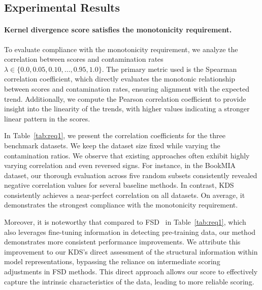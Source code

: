 
%
\subsection{Experimental Results}
\label{sec:er}


\paragraph{Kernel divergence score satisfies the monotonicity requirement.}
To evaluate compliance with the monotonicity requirement, we analyze the correlation between scores and contamination rates  $\lambda \in \{0.0, 0.05, 0.10, \ldots, 0.95, 1.0\}$.
The primary metric used is the Spearman correlation coefficient, which directly evaluates the monotonic relationship between scores and contamination rates, ensuring alignment with the expected trend.
Additionally, we compute the Pearson correlation coefficient to provide insight into the linearity of the trends, with higher values indicating a stronger linear pattern in the scores.

In Table~\ref{tab:req1}, we present the correlation coefficients for the three benchmark datasets. We keep the dataset size fixed while varying the contamination ratios.
We observe that existing approaches often exhibit highly varying correlation and even reversed signs.
For instance, in the BookMIA dataset, our thorough evaluation across five random subsets consistently revealed negative correlation values for several baseline methods. 
In contrast, KDS consistently achieves a near-perfect correlation on all datasets.
On average, it demonstrates the strongest compliance with the monotonicity requirement. 

Moreover, it is noteworthy that compared to FSD~\citep{zhang2024fine} in Table~\ref{tab:req1}, which also leverages fine-tuning information in detecting pre-training data, our method demonstrates more consistent performance improvements.
We attribute this improvement to our KDS's direct assessment of the structural information within model representations, bypassing the reliance on intermediate scoring adjustments in FSD methods. 
This direct approach allows our score to effectively capture the intrinsic characteristics of the data, leading to more reliable scoring.

